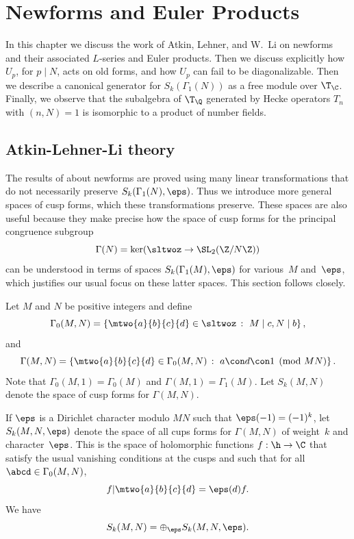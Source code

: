\documentclass{report}
\begin{document}

\chapter{Newforms and Euler Products}

In this chapter we discuss the work of Atkin, Lehner, and W.~Li on
newforms and their associated $L$-series and Euler products.  Then we
discuss explicitly how $U_p$, for $p\mid N$, acts on old forms, and
how $U_p$ can fail to be diagonalizable.  Then we describe a canonical
generator for $S_k(\Gamma_1(N))$ as a free module over $\T_\C$.
Finally, we observe that the subalgebra of $\T_\Q$ generated by Hecke
operators $T_n$ with $(n,N)=1$ is isomorphic to a product of number
fields.


\section{Atkin-Lehner-Li theory}\label{sec:atkin}
The results of \cite{winnie:newforms} about newforms are proved
using many linear transformations that do not necessarily preserve
$S_k(\Gamma_1(N),\eps)$.   Thus we introduce more general spaces of
cusp forms, which these transformations preserve.
These spaces are also useful because they make precise how the
space of cusp forms for the principal congruence subgroup
$$
  \Gamma(N) = \ker(\sltwoz\to \SL_2(\Z/N\Z))
$$
can be understood in terms of spaces $S_k(\Gamma_1(M),\eps)$ for
various~$M$ and~$\eps$, which justifies our usual focus on these
latter spaces.  This section follows \cite{winnie:newforms}
closely.

Let $M$ and $N$ be positive integers and define
\[
\Gamma_0(M,N) = \left\{ \mtwo{a}{b}{c}{d} \in\sltwoz \,:\,\, M\mid
c, N\mid b\right\},
\]
and
\[
\Gamma(M,N) = \left\{ \mtwo{a}{b}{c}{d}\in\Gamma_0(M,N) \,:\,\, a
\con d\con 1\pmod{MN}\right\}.
\]
Note that $\Gamma_0(M,1) = \Gamma_0(M)$ and $\Gamma(M,1)=
\Gamma_1(M)$.  Let $S_k(M,N)$ denote the space of cusp forms for
$\Gamma(M,N)$.

If $\eps$ is a Dirichlet character modulo $MN$ such that
$\eps(-1)=(-1)^k$, let $S_k(M,N, \eps)$ denote the space of all
cups forms for $\Gamma(M,N)$ of weight~$k$ and character~$\eps$.
This is the space of holomorphic functions $f:\h\to \C$ that
satisfy the usual vanishing conditions at the cusps and such that
for all $\abcd\in\Gamma_0(M,N)$,
\[
  f|\mtwo{a}{b}{c}{d} = \eps(d) f.
\]
 We have
\[
   S_k(M,N) = \oplus_{\eps} S_k(M,N,\eps).
\]
\end{document}
